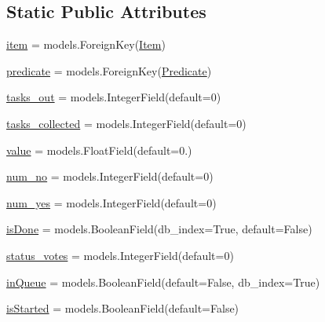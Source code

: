 \subsection*{Static Public Attributes}
\begin{DoxyCompactItemize}
\item 
\mbox{\hyperlink{classdynamicfilterapp_1_1models_1_1_i_p___pair_a4ed071da1d42b95e2465fb30952d9f80}{item}} = models.\+Foreign\+Key(\mbox{\hyperlink{classdynamicfilterapp_1_1models_1_1_item}{Item}})
\item 
\mbox{\hyperlink{classdynamicfilterapp_1_1models_1_1_i_p___pair_a59edc4e3874fffd0c2a9ef88cddfc0fa}{predicate}} = models.\+Foreign\+Key(\mbox{\hyperlink{classdynamicfilterapp_1_1models_1_1_predicate}{Predicate}})
\item 
\mbox{\hyperlink{classdynamicfilterapp_1_1models_1_1_i_p___pair_a3f60ead9e071700c26f1b3316e21cfab}{tasks\+\_\+out}} = models.\+Integer\+Field(default=0)
\item 
\mbox{\hyperlink{classdynamicfilterapp_1_1models_1_1_i_p___pair_a898da826737238e06b351e5100410bde}{tasks\+\_\+collected}} = models.\+Integer\+Field(default=0)
\item 
\mbox{\hyperlink{classdynamicfilterapp_1_1models_1_1_i_p___pair_afcc7a4b78ecd8fa7e713f8cfa0f51017}{value}} = models.\+Float\+Field(default=0.)
\item 
\mbox{\hyperlink{classdynamicfilterapp_1_1models_1_1_i_p___pair_a1404efbdb930f496cf5b5db3b4725f4a}{num\+\_\+no}} = models.\+Integer\+Field(default=0)
\item 
\mbox{\hyperlink{classdynamicfilterapp_1_1models_1_1_i_p___pair_aaff200381c3b7863a961b3b8f6c7c64b}{num\+\_\+yes}} = models.\+Integer\+Field(default=0)
\item 
\mbox{\hyperlink{classdynamicfilterapp_1_1models_1_1_i_p___pair_a9dde5beb8f6ffe59012e1b7c5ef641ef}{is\+Done}} = models.\+Boolean\+Field(db\+\_\+index=True, default=False)
\item 
\mbox{\hyperlink{classdynamicfilterapp_1_1models_1_1_i_p___pair_a1127c5a8b4c39b02ba8d32d45f1881c3}{status\+\_\+votes}} = models.\+Integer\+Field(default=0)
\item 
\mbox{\hyperlink{classdynamicfilterapp_1_1models_1_1_i_p___pair_af5ba33bf8fddcc8f610ee2d0091ded53}{in\+Queue}} = models.\+Boolean\+Field(default=False, db\+\_\+index=True)
\item 
\mbox{\hyperlink{classdynamicfilterapp_1_1models_1_1_i_p___pair_a4dfad4da8b9c480e78a3ad161ce723f1}{is\+Started}} = models.\+Boolean\+Field(default=False)

\end{DoxyCompactItemize}
